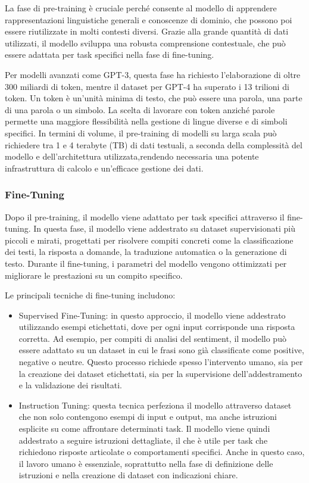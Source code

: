 \documentclass[target=mst,aauheader=,style=]{thud}
\begin{document}
La fase di pre-training è cruciale perché consente al modello di apprendere rappresentazioni linguistiche generali e conoscenze di dominio, che possono poi essere riutilizzate in molti contesti diversi. Grazie alla grande quantità di dati utilizzati, il modello sviluppa una robusta comprensione contestuale, che può essere adattata per task specifici nella fase di fine-tuning.

Per modelli avanzati come GPT-3, questa fase ha richiesto l'elaborazione di oltre 300 miliardi di token, mentre il dataset per GPT-4 ha superato i 13 trilioni di token. Un token è un'unità minima di testo, che può essere una parola, una parte di una parola o un simbolo. La scelta di lavorare con token anziché parole permette una maggiore flessibilità nella gestione di lingue diverse e di simboli specifici. In termini di volume, il pre-training di modelli su larga scala può richiedere tra 1 e 4 terabyte (TB) di dati testuali, a seconda della complessità del modello e dell'architettura utilizzata,rendendo necessaria una potente infrastruttura di calcolo e un'efficace gestione dei dati.

\subsubsection{Fine-Tuning}
Dopo il pre-training, il modello viene adattato per task specifici attraverso il fine-tuning. In questa fase, il modello viene addestrato su dataset supervisionati più piccoli e mirati, progettati per risolvere compiti concreti come la classificazione dei testi, la risposta a domande, la traduzione automatica o la generazione di testo. Durante il fine-tuning, i parametri del modello vengono ottimizzati per migliorare le prestazioni su un compito specifico.

Le principali tecniche di fine-tuning includono:

\begin{itemize}
    \item Supervised Fine-Tuning: in questo approccio, il modello viene addestrato utilizzando esempi etichettati, dove per ogni input corrisponde una risposta corretta. Ad esempio, per compiti di analisi del sentiment, il modello può essere adattato su un dataset in cui le frasi sono già classificate come positive, negative o neutre. Questo processo richiede spesso l’intervento umano, sia per la creazione dei dataset etichettati, sia per la supervisione dell'addestramento e la validazione dei risultati.
    \item Instruction Tuning: questa tecnica perfeziona il modello attraverso dataset che non solo contengono esempi di input e output, ma anche istruzioni esplicite su come affrontare determinati task. Il modello viene quindi addestrato a seguire istruzioni dettagliate, il che è utile per task che richiedono risposte articolate o comportamenti specifici. Anche in questo caso, il lavoro umano è essenziale, soprattutto nella fase di definizione delle istruzioni e nella creazione di dataset con indicazioni chiare.
\end{itemize}
\end{document}
